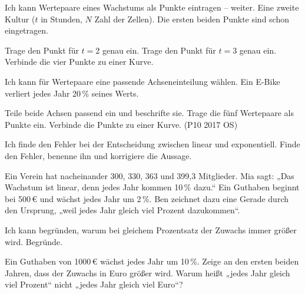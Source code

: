 \begin{aufgabe}{Ich kann Wertepaare eines Wachstums als Punkte eintragen – weiter.}
Eine zweite Kultur ($t$ in Stunden, $N$ Zahl der Zellen). Die ersten beiden Punkte sind schon eingetragen.


\begin{teile}
\teil Trage den Punkt für $t = 2$ genau ein.
\teil Trage den Punkt für $t = 3$ genau ein.
\teil Verbinde die vier Punkte zu einer Kurve.
\end{teile}

\begin{ksys}[xmin=0,xmax=4,ymin=0,ymax=400,ystep=50,xlabel=$t$ in h,ylabel=$N$]
\end{ksys}

\end{aufgabe}

\begin{aufgabe}{Ich kann für Wertepaare eine passende Achseneinteilung wählen.}
Ein E-Bike verliert jedes Jahr 20\,\% seines Werts.


\begin{teile}
\teil Teile beide Achsen passend ein und beschrifte sie.
\teil Trage die fünf Wertepaare als Punkte ein.
\teil Verbinde die Punkte zu einer Kurve. (P10 2017 OS)
\end{teile}


\end{aufgabe}

\begin{aufgabe}{Ich finde den Fehler bei der Entscheidung zwischen linear und exponentiell.}
Finde den Fehler, benenne ihn und korrigiere die Aussage.
\begin{teile}
\teil Ein Verein hat nacheinander 300, 330, 363 und 399,3 Mitglieder. Mia sagt: „Das Wachstum ist linear, denn jedes Jahr kommen 10\,\% dazu.“
\teil Ein Guthaben beginnt bei 500\,€ und wächst jedes Jahr um 2\,\%. Ben zeichnet dazu eine Gerade durch den Ursprung, „weil jedes Jahr gleich viel Prozent dazukommen“.
\end{teile}
\end{aufgabe}

\begin{aufgabe}{Ich kann begründen, warum bei gleichem Prozentsatz der Zuwachs immer größer wird.}
Begründe.
\begin{teile}
\teil Ein Guthaben von 1000\,€ wächst jedes Jahr um 10\,\%. Zeige an den ersten beiden Jahren, dass der Zuwachs in Euro größer wird.
\teil Warum heißt „jedes Jahr gleich viel Prozent“ nicht „jedes Jahr gleich viel Euro“?
\end{teile}
\end{aufgabe}

